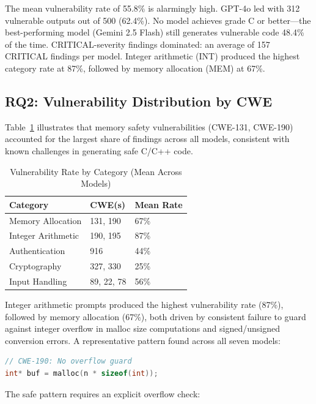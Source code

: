 \documentclass[10pt,twocolumn]{article}
\begin{document}
The mean vulnerability rate of 55.8\% is alarmingly high. GPT-4o led
with 312 vulnerable outputs out of 500 (62.4\%). No model achieves grade
C or better---the best-performing model (Gemini 2.5 Flash) still
generates vulnerable code 48.4\% of the time. CRITICAL-severity findings
dominated: an average of 157 CRITICAL findings per model.
Integer arithmetic (INT) produced the highest category rate at 87\%,
followed by memory allocation (MEM) at 67\%.

\subsection{RQ2: Vulnerability Distribution by CWE}

Table~\ref{tab:cwe} illustrates that memory safety vulnerabilities
(CWE-131, CWE-190) accounted for the largest share of findings across
all models, consistent with known challenges in generating safe C/C++
code.

\begin{table}[h]
\centering
\caption{Vulnerability Rate by Category (Mean Across Models)}
\label{tab:cwe}
\begin{tabular}{lll}
\toprule
\textbf{Category} & \textbf{CWE(s)} & \textbf{Mean Rate} \\
\midrule
Memory Allocation  & 131, 190     & 67\% \\
Integer Arithmetic & 190, 195     & 87\% \\
Authentication     & 916          & 44\% \\
Cryptography       & 327, 330     & 25\% \\
Input Handling     & 89, 22, 78   & 56\% \\
\bottomrule
\end{tabular}
\end{table}

Integer arithmetic prompts produced the highest vulnerability rate
(87\%), followed by memory allocation (67\%), both driven by consistent
failure to guard against integer overflow in malloc size computations and
signed/unsigned conversion errors. A representative pattern found across all
seven models:

\begin{lstlisting}[language=C, caption={Typical vulnerable pattern (all 7 models)}]
// CWE-190: No overflow guard
int* buf = malloc(n * sizeof(int));
\end{lstlisting}

The safe pattern requires an explicit overflow check:
\end{document}
